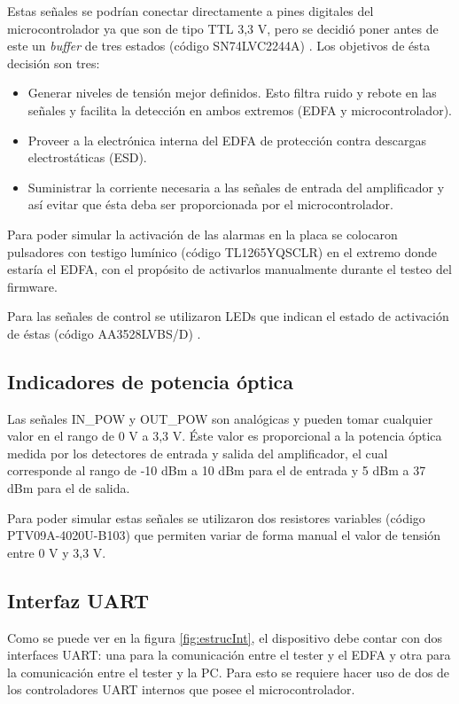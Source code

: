 Estas señales se podrían conectar directamente a pines digitales del microcontrolador ya que son de tipo TTL 3,3 V, pero se decidió poner antes de este un \textit{buffer} de tres estados (código SN74LVC2244A) \citep{WEBSITE:BUFFERS_DS}. Los objetivos de ésta decisión son tres:

\begin{itemize}
\item Generar niveles de tensión mejor definidos. Esto filtra ruido y rebote en las señales y facilita la detección en ambos extremos (EDFA y microcontrolador).
\item Proveer a la electrónica interna del EDFA de protección contra descargas electrostáticas (ESD).
\item Suministrar la corriente necesaria a las señales de entrada del amplificador y así evitar que ésta deba ser proporcionada por el microcontrolador.
\end{itemize}

Para poder simular la activación de las alarmas en la placa se colocaron pulsadores con testigo lumínico (código TL1265YQSCLR) \citep{WEBSITE:PULSADOR_DS} en el extremo donde estaría el EDFA, con el propósito de activarlos manualmente durante el testeo del firmware.

Para las señales de control se utilizaron LEDs que indican el estado de activación de éstas (código AA3528LVBS/D) \citep{WEBSITE:LEDS_DS}.

\subsection{Indicadores de potencia óptica}

Las señales IN\_POW y OUT\_POW son analógicas y pueden tomar cualquier valor en el rango de 0 V a 3,3 V. Éste valor es proporcional a la potencia óptica medida por los detectores de entrada y salida del amplificador, el cual corresponde al rango de -10 dBm a 10 dBm para el de entrada y 5 dBm a 37 dBm para el de salida.

Para poder simular estas señales se utilizaron dos resistores variables (código PTV09A-4020U-B103) \citep{WEBSITE:POTENC_DS} que permiten variar de forma manual el valor de tensión entre 0 V y 3,3 V.

\subsection{Interfaz UART}

Como se puede ver en la figura \ref{fig:estrucInt}, el dispositivo debe contar con dos interfaces UART: una para la comunicación entre el tester y el EDFA y otra para la comunicación entre el tester y la PC. Para esto se requiere hacer uso de dos de los controladores UART internos que posee el microcontrolador.


